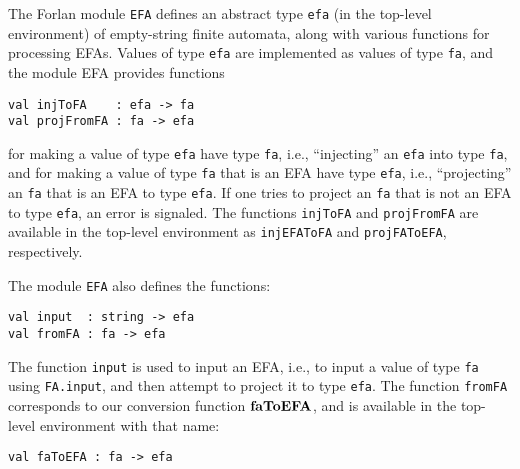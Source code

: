 The Forlan module \texttt{EFA} defines an abstract type \texttt{efa}
%
%
(in the top-level environment) of empty-string finite automata,
along with various functions for processing EFAs.
Values of type \texttt{efa} are implemented as values of type \texttt{fa}, and
the module EFA provides functions
\begin{verbatim}
val injToFA    : efa -> fa
val projFromFA : fa -> efa
\end{verbatim}
%
%
for making a value of type \texttt{efa} have type \texttt{fa}, i.e.,
``injecting'' an \texttt{efa} into type \texttt{fa}, and for
making a value of type \texttt{fa} that is an EFA have type
\texttt{efa}, i.e., ``projecting'' an \texttt{fa} that is an EFA to
type \texttt{efa}.  If one tries to project an \texttt{fa} that is not
an EFA to type \texttt{efa}, an error is signaled.  The functions
\texttt{injToFA} and \texttt{projFromFA} are available in the top-level
environment as \texttt{injEFAToFA} and \texttt{projFAToEFA}, respectively.
%
%

The module \texttt{EFA} also defines the functions:
\begin{verbatim}
val input  : string -> efa
val fromFA : fa -> efa
\end{verbatim}
%
%
The function \texttt{input} is used to input an EFA, i.e., to input a
value of type \texttt{fa} using \texttt{FA.input}, and then attempt to
project it to type \texttt{efa}.  The function \texttt{fromFA}
corresponds to our conversion function $\mathbf{faToEFA}$, and is available in
the top-level environment with that name:
\begin{verbatim}
val faToEFA : fa -> efa
\end{verbatim}
%

